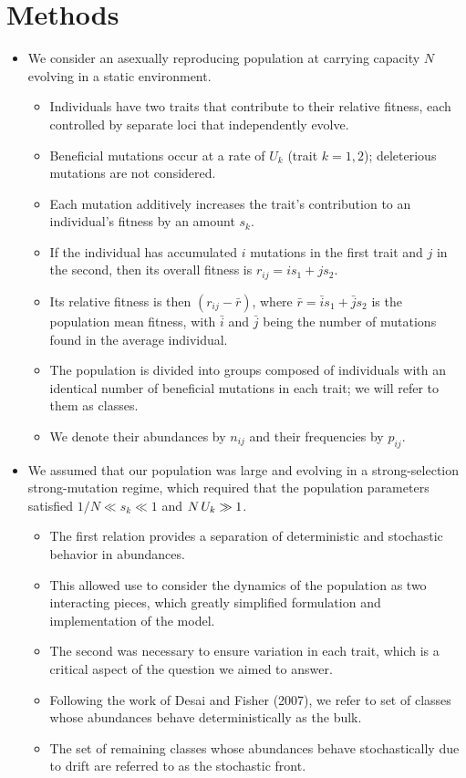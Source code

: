 \documentclass[11pt,one column]{article}
\begin{document}
\section*{Methods}
\begin{itemize}
\item We consider an asexually reproducing population at carrying capacity $N$ evolving in a static environment.
\begin{itemize}
\item Individuals have two traits that contribute to their relative fitness, each controlled by separate loci that independently evolve.
\item Beneficial mutations occur at a rate of $U_k$ (trait $k=1,2$); deleterious mutations are not considered.
\item Each mutation additively increases the trait's contribution to an individual's fitness by an amount $s_k$.
\item If the individual has accumulated $i$ mutations in the first trait and $j$ in the second, then its overall fitness is $r_{ij} = i s_1+j s_2$.
\item Its relative fitness is then $(r_{ij}-\bar{r})$, where $\bar{r} = \bar{i} s_1+\bar{j} s_2$ is the population mean fitness, with $\bar{i}$ and $\bar{j}$ being the number of mutations found in the average individual.
\item The population is divided into groups composed of individuals with an identical number of beneficial mutations in each trait; we will refer to them as classes.
\item We denote their abundances by $n_{ij}$ and their frequencies by $p_{ij}$.
\end{itemize}	

\item We assumed that our population was large and evolving in a strong-selection strong-mutation regime, which required that the population parameters satisfied $1/N \ll s_k \ll 1$ and $N\hspace{.02in}U_k \gg 1$.
\begin{itemize}
\item The first relation provides a separation of deterministic and stochastic behavior in abundances.
\item This allowed use to consider the dynamics of the population as two interacting pieces, which greatly simplified formulation and implementation of the model.
\item The second was necessary to ensure variation in each trait, which is a critical aspect of the question we aimed to answer.
\item Following the work of Desai and Fisher (2007), we refer to set of classes whose abundances behave deterministically as the bulk.
\item The set of remaining classes whose abundances behave stochastically due to drift are referred to as the stochastic front.
\end{itemize}


\end{itemize}
\end{document}
